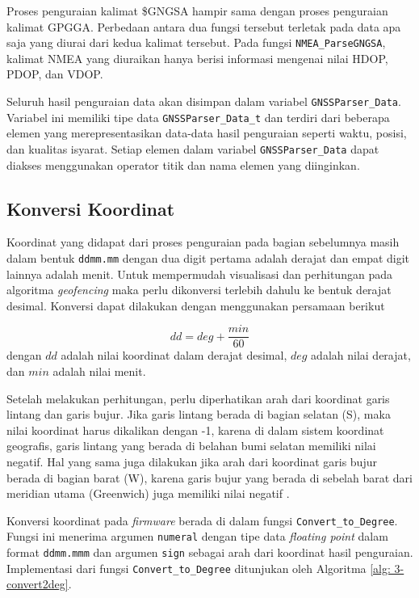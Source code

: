 Proses penguraian kalimat \$GNGSA hampir sama dengan proses penguraian kalimat GPGGA. Perbedaan antara dua fungsi tersebut terletak pada data apa saja yang diurai dari kedua kalimat tersebut. Pada fungsi \texttt{NMEA\_ParseGNGSA}, kalimat NMEA yang diuraikan hanya berisi informasi mengenai nilai HDOP, PDOP, dan VDOP.

Seluruh hasil penguraian data akan disimpan dalam variabel \texttt{GNSSParser\_Data}. Variabel ini memiliki tipe data \texttt{GNSSParser\_Data\_t} dan terdiri dari beberapa elemen yang merepresentasikan data-data hasil penguraian seperti waktu, posisi, dan kualitas isyarat. Setiap elemen dalam variabel \texttt{GNSSParser\_Data} dapat diakses menggunakan operator titik dan nama elemen yang diinginkan.

\subsection{Konversi Koordinat}
Koordinat yang didapat dari proses penguraian pada bagian sebelumnya masih dalam bentuk \texttt{ddmm.mm} dengan dua digit pertama adalah derajat dan empat digit lainnya adalah menit. Untuk mempermudah visualisasi dan perhitungan pada algoritma \textit{geofencing} maka perlu dikonversi terlebih dahulu ke bentuk derajat desimal. Konversi dapat dilakukan dengan menggunakan persamaan berikut

\begin{equation}
	dd = deg + \frac{min}{60} 
\end{equation}
dengan $dd$ adalah nilai koordinat dalam derajat desimal, $deg$ adalah nilai derajat, dan $min$ adalah nilai menit.

Setelah melakukan perhitungan, perlu diperhatikan arah dari koordinat garis lintang dan garis bujur. Jika garis lintang berada di bagian selatan (S), maka nilai koordinat harus dikalikan dengan -1, karena di dalam sistem koordinat geografis, garis lintang yang berada di belahan bumi selatan memiliki nilai negatif. Hal yang sama juga dilakukan jika arah dari koordinat garis bujur berada di bagian barat (W), karena garis bujur yang berada di sebelah barat dari meridian utama (Greenwich) juga memiliki nilai negatif \cite{AlHindawi2012}.

Konversi koordinat pada \textit{firmware} berada di dalam fungsi \texttt{Convert\_to\_Degree}. Fungsi ini menerima argumen \texttt{numeral} dengan tipe data \textit{floating point} dalam format \texttt{ddmm.mmm} dan argumen \texttt{sign} sebagai arah dari koordinat hasil penguraian. Implementasi dari fungsi \texttt{Convert\_to\_Degree} ditunjukan oleh Algoritma \ref{alg: 3-convert2deg}.

